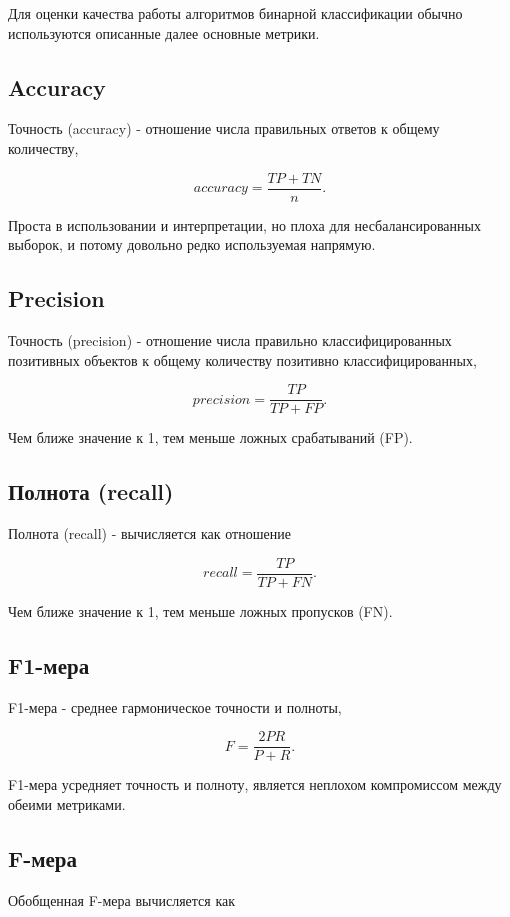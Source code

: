 Для оценки качества работы алгоритмов бинарной классификации обычно используются описанные далее основные метрики.

\subsection{Accuracy}

Точность (accuracy) - отношение числа правильных ответов к общему количеству,

$$
accuracy = \frac{TP + TN}{n}.
$$

Проста в использовании и интерпретации, но плоха для несбалансированных выборок, и потому довольно редко используемая напрямую.

\subsection{Precision}

Точность (precision) - отношение числа правильно классифицированных позитивных объектов к общему количеству позитивно классифицированных,

$$
precision = \frac{TP}{TP + FP}.
$$

Чем ближе значение к 1, тем меньше ложных срабатываний (FP).

\subsection{Полнота (recall)}

Полнота (recall) - вычисляется как отношение

$$
recall = \frac{TP}{TP + FN}.
$$

Чем ближе значение к 1, тем меньше ложных пропусков (FN).

\subsection{F1-мера}

F1-мера - среднее гармоническое точности и полноты,

$$
F = \frac{2PR}{P + R}.
$$

F1-мера усредняет точность и полноту, является неплохом компромиссом между обеими метриками.

\subsection{F-мера}

Обобщенная F-мера вычисляется как

